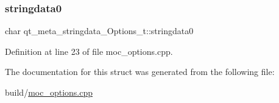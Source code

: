 \mbox{\label{structqt__meta__stringdata___options__t_a1c10b521fc0bfc89e2ad3c4ae2bc0b34}} 
\subsubsection{\texorpdfstring{stringdata0}{stringdata0}}
{\footnotesize\ttfamily char qt\+\_\+meta\+\_\+stringdata\+\_\+\+Options\+\_\+t\+::stringdata0}



Definition at line 23 of file moc\+\_\+options.\+cpp.



The documentation for this struct was generated from the following file\+:\begin{DoxyCompactItemize}
\item 
build/\mbox{\hyperlink{build_2moc__options_8cpp}{moc\+\_\+options.\+cpp}}\end{DoxyCompactItemize}
